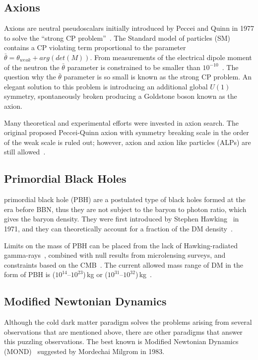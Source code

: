 \subsection{Axions}

Axions are neutral pseudoscalars initially introduced by Peccei and Quinn in 1977 to solve the ``strong CP problem''~\cite{Peccei:1977hh}. The Standard model of particles (SM) contains a CP violating term proportional to the parameter $\bar{\theta} = \theta_{weak}+ arg(det(M))$. From measurements  of the electrical dipole moment of the neutron the $\bar{\theta}$ parameter is constrained to be smaller than $10^{-10}$~\cite{Pospelov:2005pr,Baker:2006ts}. The question why the $\bar{\theta}$ parameter is so small is known as the strong CP problem. An elegant solution to this problem is introducing an additional global $U(1)$ symmetry, spontaneously broken producing a Goldstone boson known as the axion. 

Many theoretical and experimental efforts were invested in axion search. The original proposed Peccei-Quinn axion with symmetry breaking scale in the order of the weak scale is ruled out; however, axion and axion like particles (ALPs) are still allowed~\cite{Kim:1979if,Akerib:2017uem}. 

\subsection{Primordial Black Holes}
primordial black hole (PBH) are a postulated type of black holes formed at the era before BBN, thus they are not subject to the baryon to photon ratio, which gives the baryon density. They were first introduced by Stephen Hawking~\cite{PBH} in 1971, and they can theoretically account for a fraction of the DM density~\cite{Carr:2016drx}. 

Limits on the mass of PBH can be placed from the lack
of Hawking-radiated gamma-rays~\cite{MacGibbon:1987my}, combined with null results from microlensing surveys, and constraints based on the CMB~\cite{Ricotti:2007au}. The current allowed mass range of DM in the form of PBH is ($10^{14}$--$10^{23}$)\,kg or ($10^{31}$--$10^{32}$)\,kg~\cite{Bird:2016dcv}.

\subsection{Modified Newtonian Dynamics}
\label{subsec:MOND}

Although the cold dark matter paradigm solves the problems arising from several observations that are mentioned above, there are other paradigms that answer this puzzling observations. The best known is Modified Newtonian Dynamics (MOND)~\cite{Milgrom:1983ca} suggested by Mordechai Milgrom in 1983.

